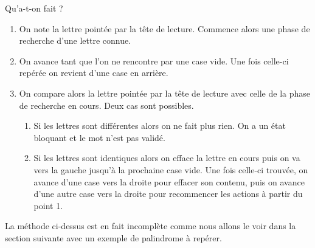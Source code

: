 Qu'a-t-on fait ?
\begin{enumerate}
	\item On note la lettre pointée par la tête de lecture.
	      Commence alors une phase de recherche d'une lettre connue.

	\item On avance tant que l'on ne rencontre par une case vide. Une fois celle-ci repérée on revient d'une case en arrière.
	
	\item On compare alors la lettre pointée par la tête de lecture avec celle de la phase de recherche en cours. Deux cas sont possibles.
	\begin{enumerate}
		\item Si les lettres sont différentes alors on ne fait plus rien. 
		      On a un état bloquant et le mot n'est pas validé.

		\item Si les lettres sont identiques alors on efface la lettre en cours puis on va vers la gauche jusqu'à la prochaine case vide. 
		      Une fois celle-ci trouvée, on avance d'une case vers la droite pour effacer son contenu, puis on avance d'une autre case vers la droite pour recommencer les actions à partir du point 1.
	\end{enumerate}
\end{enumerate}


La méthode ci-dessus est en fait incomplète comme nous allons le voir dans la section suivante avec un exemple de palindrome à repérer.

